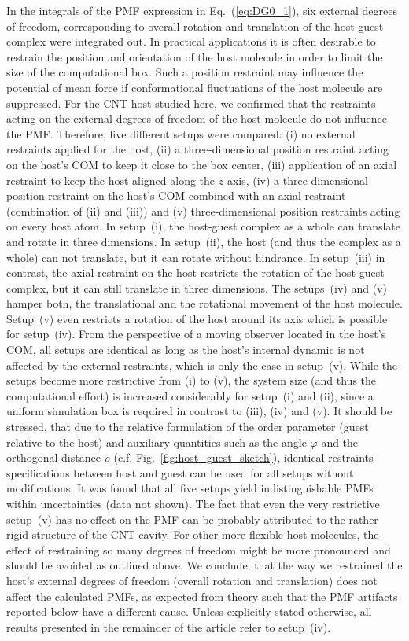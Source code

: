 \documentclass[9pt,lessons]{livecoms}
\begin{document}
In the integrals of the PMF expression in Eq.~(\ref{eq:DG0_1}), six external degrees of freedom, corresponding to overall rotation and translation of the host-guest complex were integrated out. 
In practical applications it is often desirable to restrain the position and orientation of the host molecule in order to limit the size of the computational box. 
Such a position restraint may influence the potential of mean force if conformational fluctuations of the host molecule are suppressed. 
For the CNT host studied here, we confirmed that the restraints acting on the external degrees of freedom of the host molecule do not influence the PMF. 
Therefore, five different setups were compared: 
(i) no external restraints applied for the host, 
(ii) a three-dimensional position restraint acting on the host's COM to keep it close to the box center, 
(iii) application of an axial restraint to keep the host aligned along the $z$-axis, 
(iv) a three-dimensional position restraint on the host's COM combined with an axial restraint (combination of (ii) and (iii)) 
and (v) three-dimensional position restraints acting on every host atom.
In setup~(i), the host-guest complex as a whole can translate and rotate in three dimensions. 
In setup~(ii), the host (and thus the complex as a whole) can not translate, but it can rotate without hindrance. 
In setup~(iii) in contrast, the axial restraint on the host restricts the rotation of the host-guest complex, but it can still translate in three dimensions. 
The setups~(iv) and (v) hamper both, the translational and the rotational movement of the host molecule.
Setup~(v) even restricts a rotation of the host around its axis which is possible for setup~(iv).
From the perspective of a moving observer located in the host's COM, all setups are identical as long as the host's internal dynamic is not affected by the external restraints, which is only the case in setup~(v).
While the setups become more restrictive from (i) to (v), the system size (and thus the computational effort) is increased considerably for setup~(i) and (ii), 
since a uniform simulation box is required in contrast to (iii), (iv) and (v).
It should be stressed, that due to the relative formulation of the order parameter (guest relative to the host) and auxiliary quantities such as the angle $\varphi$ and the orthogonal distance $\rho$ 
(c.f. Fig.~\ref{fig:host_guest_sketch}), identical restraints specifications between host and guest can be used for all setups without modifications.
%
It was found that all five setups yield indistinguishable PMFs within uncertainties (data not shown).
The fact that even the very restrictive setup~(v) has no effect on the PMF can be probably attributed to the rather rigid structure of the CNT cavity.
For other more flexible host molecules, the effect of restraining so many degrees of freedom might be more pronounced and should be avoided as outlined above.
We conclude, that the way we restrained the host's external degrees of freedom (overall rotation and translation) does not affect the calculated PMFs, as expected from theory 
such that the PMF artifacts reported below have a different cause.
Unless explicitly stated otherwise, all results presented in the remainder of the article refer to setup~(iv).
\end{document}
